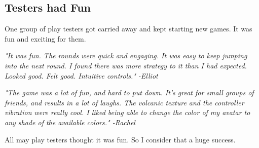 \documentclass[conference,compsoc]{IEEEtran}
\begin{document}
\subsection{Testers had Fun}

One group of play testers got carried away and kept starting new games. It was fun and exciting for them.

\textit{"It was fun. The rounds were quick and engaging. It was easy to keep jumping into the next round. I found there was more strategy to it than I had expected. Looked good. Felt good. Intuitive controls." -Elliot}

\textit{"The game was a lot of fun, and hard to put down. It’s great for small groups of friends, and results in a lot of laughs. The volcanic texture and the controller vibration were really cool. I liked being able to change the color of my avatar to any shade of the available colors." -Rachel}

All may play testers thought it was fun. So I consider that a huge success.
\end{document}
